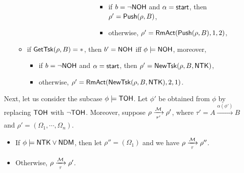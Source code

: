 \begin{itemize}
\begin{itemize}
\begin{itemize}
\begin{itemize}
\begin{itemize}
\begin{itemize}
\begin{itemize}
\begin{itemize}
							\begin{itemize}
								\item if $b = \neg {\sf NOH}$ and $\alpha = {\mathsf{start} }$, then $\rho'=\mathsf{Push}(\rho, B)$,
								\item otherwise, $\rho' = \mathsf{RmAct}(\mathsf{Push}(\rho, B), 1, 2)$, 
							\end{itemize}
						\end{itemize}
					\end{itemize}
				\end{itemize}
			\end{itemize}
		\end{itemize}
	\end{itemize}
	\item if $\mathsf{GetTsk}(\rho, B) = *$, then $b' = {\sf NOH}$ iff $\phi \models {\sf NOH}$, moreover, 
		\begin{itemize}
			\item if $b = \neg {\sf NOH}$ and $\alpha = {\mathsf{start} }$, then $\rho' = \mathsf{NewTsk}(\rho, B, {\sf NTK})$, 
			\item otherwise, $\rho' = \mathsf{RmAct}(\mathsf{NewTsk}(\rho, B, {\sf NTK}), 2, 1)$.
		\end{itemize}				
	\end{itemize}
\end{itemize}

Next, let us consider the subcase $\phi \models {\sf TOH}$.
Let $\phi'$ be obtained from $\phi$ by replacing ${\sf TOH}$ with $\neg {\sf TOH}$. Moreover, 
suppose $\rho \xrightarrow [\tau']{{\mathcal{M} }} \rho'$, where $\tau' = A \xrightarrow{\alpha(\phi')} B$ and $\rho' = (\Omega_1, \cdots, \Omega_{n})$. 
\begin{itemize}
\item If $\phi \models {\sf NTK} \vee {\sf NDM}$, then let $\rho'' = (\Omega_1)$ and we have $\rho \xrightarrow [\tau]{{\mathcal{M} }} \rho''$.
%
\item Otherwise, $\rho \xrightarrow [\tau]{{\mathcal{M} }} \rho'$.
\end{itemize}

